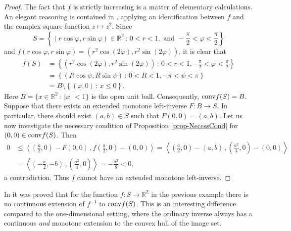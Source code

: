 \documentclass[12pt]{amsart}
\theoremstyle{remark}
\theoremstyle{definition}
\newcommand{\RR}{\mathbb{R}}
\newcommand{\exmo}{extended monotone left-inverse }
\newcommand{\nma}{\Vert}
\newcommand{\conv}{\mbox{\rm conv}}
\newcommand{\map}{\longrightarrow}
\newcommand{\bsz}[2]{\left \langle #1 \,, #2 \right \rangle}
\begin{document}
\begin{proof}
The fact that $ f $ is strictly increasing is a matter 
of elementary calculations. An elegant reasoning is 
contained in \cite[5. Remark]{60ISFE}, applying an 
identification between $ f $ and the complex square 
function $ z \mapsto z^2 $. 
Since 
\[
S = \left \lbrace (r \cos \varphi, r \sin \varphi) \in \RR^2 
\, : \, 0 < r < 1, 
\mbox{ and } 
-\frac{\pi}{2}  < \varphi < \frac{\pi}{2} \right \rbrace 
\]
and $ f \left( r \cos \varphi, r \sin \varphi \right) 
= \left( r^2 \cos \left( 2 \varphi \right) , 
r^2 \sin \left( 2 \varphi \right) \right) $, it is clear that 
\begin{align*}
f(S) & = 
\left \lbrace 
\left( r^2 \cos \left( 2 \varphi \right) , 
r^2 \sin \left( 2 \varphi \right) \right) 
\, : \, 
0 < r < 1, 
-\frac{\pi}{2}  < \varphi < \frac{\pi}{2} 
\right \rbrace  
\\ & = 
\left \lbrace 
\left( R \cos \psi , 
R \sin \psi \right) 
\, : \, 
0 < R < 1, -\pi  < \psi < \pi 
\right \rbrace 
\\ & = 
B \setminus 
\left \lbrace (x,0) \, : \, x \leq 0 \right \rbrace. 
\end{align*} 
Here 
$ B = \lbrace x \in \RR^2 \, : \, \nma x \nma < 1 \rbrace $ 
is the open unit ball. 
Consequently, $ \conv f(S) = B $. Suppose that there 
exists an \exmo $ F : B \map S $.  
In particular, there should exist $ (a,b) \in S $ such 
that $ F(0,0) = (a,b) $. 
Let us now investigate 
the necessary condition of Proposition \ref{prop-NecessCond} 
for $ (0,0) \in \conv f(S) $. 
Then 
\begin{align*}
0 & \leq \bsz{\left( \frac{a}{2} , 0 \right) - F(0,0)}{ 
f \left( \frac{a}{2} , 0 \right) - (0,0)} 
 = 
\bsz{\left( \frac{a}{2} , 0 \right) - (a,b)}{ 
\left( \frac{a^2}{4} , 0 \right) - (0,0)} 
\\ & = 
\bsz{ \left( - \frac{a}{2}, -b \right) }{
\left( \frac{a^2}{4}, 0 \right)} = - \frac{a^3}{8} < 0, 
\end{align*}
a contradiction. Thus $ f $ cannot have an 
extended monotone left-inverse. 
\end{proof}
In \cite[5. Remark]{60ISFE} it was proved that for 
the function $ f : S \map \RR^2 $ in the previous 
example there is no continuous extension of 
$ f^{-1} $ to $ \conv f(S) $. 
This is an interesting difference compared to the 
one-dimensional setting, where the ordinary inverse 
always has a continuous {\em and} monotone 
extension to the convex hull of the image set. 
\end{document}
